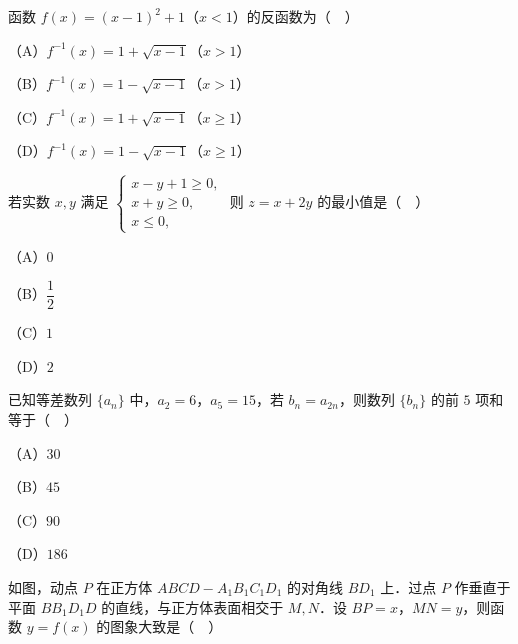 \begin{question}
函数 $f(x)=(x-1)^2+1$（$x<1$）的反函数为（　）

（A）$f^{-1}(x)=1+\sqrt{x-1}$（$x>1$）

（B）$f^{-1}(x)=1-\sqrt{x-1}$（$x>1$）

（C）$f^{-1}(x)=1+\sqrt{x-1}$（$x\geqslant1$）

（D）$f^{-1}(x)=1-\sqrt{x-1}$（$x\geqslant1$）

\end{question}
\begin{question}
若实数 $x,y$ 满足 $\begin{cases}x-y+1\geqslant0,\\ x+y\geqslant0,\\ x\leqslant0,\end{cases}$ 则 $z=x+2y$ 的最小值是（　）

（A）$0$

（B）$\dfrac12$

（C）$1$

（D）$2$

\end{question}
\begin{question}
已知等差数列 $\{a_n\}$ 中，$a_2=6$，$a_5=15$，若 $b_n=a_{2n}$，则数列 $\{b_n\}$ 的前 $5$ 项和等于（　）

（A）$30$

（B）$45$

（C）$90$

（D）$186$

\Needspace{0.4\textheight}
\end{question}
\begin{question}
如图，动点 $P$ 在正方体 $ABCD-A_1B_1C_1D_1$ 的对角线 $BD_1$ 上．过点 $P$ 作垂直于平面 $BB_1D_1D$ 的直线，与正方体表面相交于 $M,N$．设 $BP=x$，$MN=y$，则函数 $y=f(x)$ 的图象大致是（　）
\nopagebreak[4]
\begin{center}\end{center}
\nopagebreak[4]
\end{question}

